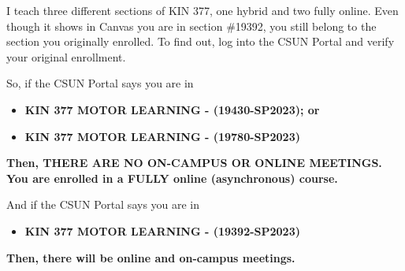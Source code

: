 \documentclass[
  letterpaper,
  DIV=11,
  numbers=noendperiod]{scrartcl}
\providecommand{\tightlist}{%
  \setlength{\itemsep}{0pt}\setlength{\parskip}{0pt}}\usepackage{longtable,booktabs,array}
\begin{document}
\begin{tcolorbox}[enhanced jigsaw, colbacktitle=quarto-callout-warning-color!10!white, rightrule=.15mm, opacityback=0, colframe=quarto-callout-warning-color-frame, leftrule=.75mm, breakable, bottomrule=.15mm, arc=.35mm, opacitybacktitle=0.6, title=\textcolor{quarto-callout-warning-color}{\faExclamationTriangle}\hspace{0.5em}{Warning}, titlerule=0mm, toptitle=1mm, bottomtitle=1mm, left=2mm, toprule=.15mm, colback=white, coltitle=black]

I teach three different sections of KIN 377, one hybrid and two fully
online. Even though it shows in Canvas you are in section \#19392, you
still belong to the section you originally enrolled. To find out, log
into the CSUN Portal and verify your original enrollment.

So, if the CSUN Portal says you are in~

\begin{itemize}
\item
  \textbf{KIN 377 MOTOR LEARNING - (19430-SP2023); or}
\item
  \textbf{KIN 377 MOTOR LEARNING - (19780-SP2023)}
\end{itemize}

\textbf{Then, THERE ARE NO ON-CAMPUS OR ONLINE MEETINGS. You are
enrolled in a FULLY online (asynchronous) course.}

And if the CSUN Portal says you are in

\begin{itemize}
\tightlist
\item
  \textbf{KIN 377 MOTOR LEARNING - (19392-SP2023)}
\end{itemize}

\textbf{Then, there will be online and on-campus meetings.}

\end{tcolorbox}
\end{document}
